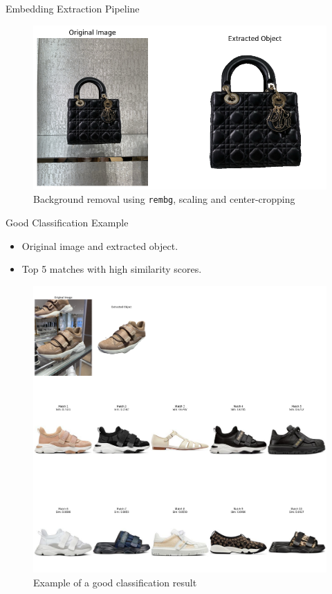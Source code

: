 \documentclass{beamer}
\begin{document}
\begin{frame}{Embedding Extraction Pipeline}
    \begin{figure}
        \includegraphics[width=\textwidth]{assets/background_removal.png}
        \caption{Background removal using \texttt{rembg}, scaling and center-cropping}
    \end{figure}
\end{frame}

\begin{frame}{Good Classification Example}
\begin{itemize}
    \item Original image and extracted object.
    \item Top 5 matches with high similarity scores.
\end{itemize}
\begin{figure}
    \includegraphics[width=\textwidth]{assets/good_classification.png}
    \caption{Example of a good classification result}
\end{figure}
\end{frame}
\end{document}
